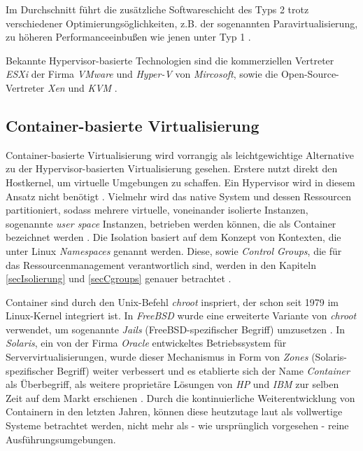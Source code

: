 \documentclass[../main.tex]{subfiles}
\begin{document}
			Im Durchschnitt führt die zusätzliche Softwareschicht des Typs 2 trotz verschiedener Optimierungsöglichkeiten, z.B. der sogenannten Paravirtualisierung, zu höheren Performanceeinbußen wie jenen unter Typ 1 \cite[S.666f.]{tanenbaumOS}\cite[S.2]{dockerSec1}.


      Bekannte Hypervisor-basierte Technologien sind die kommerziellen Vertreter \emph{ESXi} der Firma \emph{VMware} und \emph{Hyper-V} von \emph{Mircosoft}, sowie die Open-Source-Vertreter \emph{Xen} und \emph{KVM} \cite[S.1]{dockerLXCKub}.


    \subsection{Container-basierte Virtualisierung}
    \label{introVirtContainer}
      Container-basierte Virtualisierung wird vorrangig als leichtgewichtige Alternative zu der Hypervisor-basierten Virtualisierung gesehen\cite[S.2]{containerVirtPerformance}. Erstere nutzt direkt den Hostkernel, um virtuelle Umgebungen zu schaffen. Ein Hypervisor wird in diesem Ansatz nicht benötigt \cite[S.6+7]{dockerBook}. Vielmehr wird das native System und dessen Ressourcen partitioniert, sodass mehrere virtuelle, voneinander isolierte Instanzen, sogenannte \emph{user space} Instanzen, betrieben werden können, die als Container bezeichnet werden \cite[S.2]{containerVirtPerformance}\cite[S.3]{dockerSecIntro}\cite[S.1]{dockerSec2}. Die Isolation basiert auf dem Konzept von Kontexten, die unter Linux \emph{Namespaces} genannt werden. Diese, sowie \emph{Control Groups}, die für das Ressourcenmanagement verantwortlich sind, werden in den Kapiteln \ref{secIsolierung} und \ref{secCgroups} genauer betrachtet \cite[S.4]{dockerSecIntro}.

      Container sind durch den Unix-Befehl \emph{chroot}\cite{chroot} inspriert, der schon seit 1979 im Linux-Kernel integriert ist. In \emph{FreeBSD} wurde eine erweiterte Variante von \emph{chroot} verwendet, um sogenannte \emph{Jails} (FreeBSD-spezifischer Begriff) umzusetzen \cite{jails}. In \emph{Solaris}, ein von der Firma \emph{Oracle} entwickeltes Betriebssystem für Servervirtualisierungen\cite{solaris}, wurde dieser Mechanismus in Form von \emph{Zones} (Solaris-spezifischer Begriff) \cite{zones} weiter verbessert und es etablierte sich der Name \emph{Container} als Überbegriff, als weitere proprietäre Lösungen von \emph{HP} und \emph{IBM} zur selben Zeit auf dem Markt erschienen \cite[S.2]{dockerLXCKub}. Durch die kontinuierliche Weiterentwicklung von Containern in den letzten Jahren, können diese heutzutage laut \cite[S.7]{dockerBook} als vollwertige Systeme betrachtet werden, nicht mehr als - wie ursprünglich vorgesehen - reine Ausführungsumgebungen.
\end{document}
